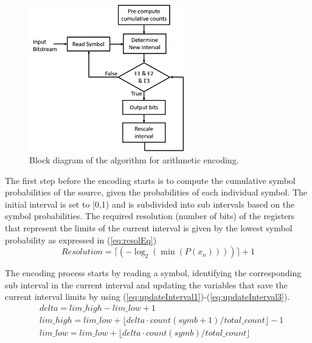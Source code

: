\begin{refsection}
\begin{figure}[t]
	\centering
	\includegraphics[width=0.6\textwidth]{./sdf/eit_46084_arithmetic_encoder_decoder/figures/ArithEncoderBlockDiagram.png}
	\caption{Block diagram of the algorithm for arithmetic encoding.} \label{fig:arithEncBlockDiagr}
\end{figure}

The first step before the encoding starts is to compute the cumulative symbol probabilities of the source, given the probabilities of each individual symbol. The initial interval is set to [0,1) and is subdivided into sub intervals based on the symbol probabilities. The required resolution (number of bits) of the registers that represent the limits of the current interval is given by the lowest symbol probability as expressed in (\ref{eq:resolEq})
\begin{equation} \label{eq:resolEq}
	Resolution = \lceil(-\log_2(\min(P(x_n))))\rceil + 1
\end{equation}

The encoding process starts by reading a symbol, identifying the corresponding sub interval in the current interval and updating the variables that save the current interval limits by using (\ref{eq:updateInterval1})-(\ref{eq:updateInterval3}).
\begin{eqnarray} 
\label{eq:updateInterval1} &delta = lim\_high - lim\_low + 1 \\
&lim\_high = lim\_low + \lfloor delta \cdot count(symb + 1) / total\_count \rfloor - 1 \\
\label{eq:updateInterval3} &lim\_low = lim\_low + \lfloor delta \cdot count(symb) / total\_count \rfloor 
\end{eqnarray}


\end{refsection}
